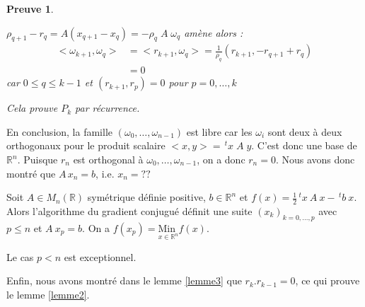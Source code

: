 \documentclass[a4paper,11pt]{article}
\newcommand{\R}{\mathbb{R}}
\newcommand{\tpo}[1]{\,^t#1}
\newcommand{\MinI}[1]{\underset{#1}{\text{Min }}}
\theoremstyle{plain} %
\newtheorem{preuve}{Preuve}
\begin{document}
\begin{preuve}
\begin{enumerate}[label=•]
            \vspace{0.4cm}
            $\rho_{q+1} - r_q = A(x_{q+1}-x_q) = - \rho_q \; A \; \omega_q$ amène alors :
            \begin{align*}
                <\omega_{k+1},\omega_q> & = <r_{k+1}, \omega_q> = \frac{1}{\rho_q}(r_{k+1},-r_{q+1}+r_q) \\
                & = 0
            \end{align*}
            car $0 \leq q \leq k-1$ et $(r_{k+1},r_p) = 0$ pour $p = 0,\dots,k$

            Cela prouve $P_k$ par récurrence.
    \end{enumerate}
\end{preuve}

En conclusion, la famille $(\omega_0, \dots, \omega_{n-1})$ est libre car les $\omega_i$ sont
deux à deux orthogonaux pour le produit scalaire $<x,y> = \tpo x \; A \; y$. C'est donc une
base de $\R^n$. Puisque $r_n$ est orthogonal à $\omega_0, \dots, \omega_{n-1}$, on a donc
$r_n=0$. Nous avons donc montré que $A \, x_n = b$, i.e. $x_n=??$

\begin{ftheo}
    Soit $A \in M_n(\R)$ symétrique définie positive, $b \in \R^n$ et $f(x) = \frac{1}{2} \tpo x \: A \: x - \tpo b \: x$.
    Alors l'algorithme du gradient conjugué définit une suite $(x_k)_{k=0,\dots,p}$ avec
    $p \leq n$ et $A \: x_p = b$. On a $f(x_p) = \MinI{x \in \R^n} f(x)$.
\end{ftheo}

\begin{remark}
    Le cas $p<n$ est exceptionnel.
\end{remark}

Enfin, nous avons montré dans le lemme \ref{lemme3} que $r_k.r_{k-1}=0$, ce qui prouve le lemme
\ref{lemme2}.
\end{document}
